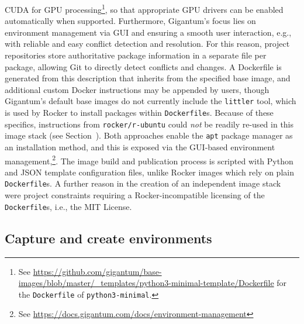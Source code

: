 \begin{itemize}
  CUDA for GPU
  processing\footnote{See \href{https://github.com/gigantum/base-images/blob/master/_templates/python3-minimal-template/Dockerfile}{https://github.com/gigantum/base-images/blob/master/\_templates/python3-minimal-template/Dockerfile} for the \texttt{Dockerfile} of \texttt{python3-minimal}.},
  so that appropriate GPU drivers can be enabled automatically when
  supported. Furthermore, Gigantum's focus lies on environment
  management via GUI and ensuring a smooth user interaction, e.g., with
  reliable and easy conflict detection and resolution. For this reason,
  project repositories store authoritative package information in a
  separate file per package, allowing Git to directly detect conflicts
  and changes. A Dockerfile is generated from this description that
  inherits from the specified base image, and additional custom Docker
  instructions may be appended by users, though Gigantum's default base
  images do not currently include the \texttt{littler} tool, which is
  used by Rocker to install packages within \texttt{Dockerfile}s.
  Because of these specifics, instructions from \texttt{rocker/r-ubuntu}
  could \emph{not} be readily re-used in this image stack (see
  Section~). Both approaches enable the
  \texttt{apt} package manager \citep{wikipedia_contributors_apt_2020}
  as an installation method, and this is exposed via the GUI-based
  environment
  management,\footnote{See \href{https://docs.gigantum.com/docs/environment-management}{https://docs.gigantum.com/docs/environment-management}}.
  The image build and publication process is scripted with Python and
  JSON template configuration files, unlike Rocker images which rely on
  plain \texttt{Dockerfile}s. A further reason in the creation of an
  independent image stack were project constraints requiring a
  Rocker-incompatible licensing of the \texttt{Dockerfile}s, i.e., the
  MIT License.
\end{itemize}

\hypertarget{capture-and-create-environments}{%
\subsection{Capture and create
environments}\label{capture-and-create-environments}}

\label{envs}

